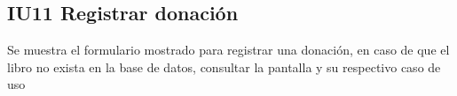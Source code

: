\newpage
\subsection{IU11 Registrar donación}
	Se muestra el formulario mostrado para registrar una donación, en caso de que el libro no exista en la base de datos, consultar la pantalla  y su respectivo caso de uso
